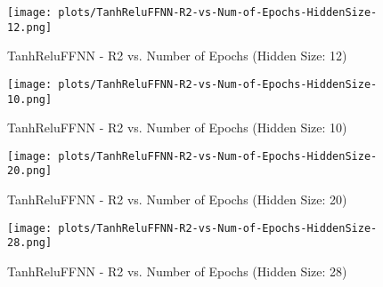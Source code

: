 
\begin{figure}[H]
    \centering
    \texttt{[image: plots/TanhReluFFNN-R2-vs-Num-of-Epochs-HiddenSize-12.png]}
    \caption{TanhReluFFNN - R2 vs. Number of Epochs (Hidden Size: 12)}
\end{figure}

\begin{figure}[H]
    \centering
    \texttt{[image: plots/TanhReluFFNN-R2-vs-Num-of-Epochs-HiddenSize-10.png]}
    \caption{TanhReluFFNN - R2 vs. Number of Epochs (Hidden Size: 10)}
\end{figure}

\begin{figure}[H]
    \centering
    \texttt{[image: plots/TanhReluFFNN-R2-vs-Num-of-Epochs-HiddenSize-20.png]}
    \caption{TanhReluFFNN - R2 vs. Number of Epochs (Hidden Size: 20)}
\end{figure}

\begin{figure}[H]
    \centering
    \texttt{[image: plots/TanhReluFFNN-R2-vs-Num-of-Epochs-HiddenSize-28.png]}
    \caption{TanhReluFFNN - R2 vs. Number of Epochs (Hidden Size: 28)}
\end{figure}
